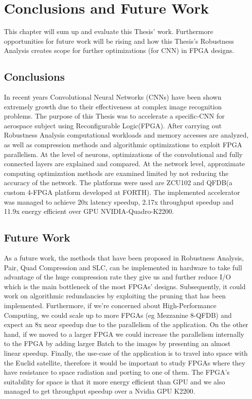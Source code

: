 \chapter{Conclusions and Future Work} %
\label{Chapter7}

This chapter will sum up and evaluate this Thesis’ work. Furthermore opportunities for future work will be rising and how this Thesis's Robustness Analysis creates scope for further optimizations (for CNN) in FPGA designs. 

\section{Conclusions}
In recent years Convolutional Neural Networks (CNNs) have been shown extremely growth due to their effectiveness at complex image recognition problems.
The purpose of this Thesis was to accelerate a specific-CNN for aerospace subject using  Reconfigurable Logic(FPGA).
After carrying out Robustness Analysis computational workloads and memory accesses are analyzed, as well as compression methods and algorithmic optimizations to exploit FPGA parallelism. At the level of neurons, optimizations of the convolutional and fully connected layers are explained and compared. At the network level, approximate computing optimization methods are examined limited by not reducing the accuracy of the network. The platforms were used are ZCU102 and QFDB(a custom 4-FPGA platform developed at FORTH). The implemented accelerator was managed to achieve 20x latency speedup, 2.17x throughput speedup and 11.9x energy efficient over GPU NVIDIA-Quadro-K2200.

\section{Future Work}

As a future work, the methods that have been proposed in Robustness Analysis, Pair, Quad Compression and SLC,  can be implemented in hardware to take full advantage of the huge compression rate they give us and further reduce I/O which is the main bottleneck of the most FPGAs' designs.
Subsequently, it could work on algorithmic redundancies by exploiting the pruning that has been implemented.
Furthermore, if we're concerned about High-Performance Computing, we could scale up to more FPGAs (eg Mezzanine 8-QFDB) and expect an 8x near speedup due to the parallelism of the application. On the other hand, if we moved to a larger FPGA we could increase the parallelism internally to the FPGA by adding larger Batch to the images by presenting an almost linear speedup.
Finally, the use-case of the application is to travel into space with the Euclid satellite, therefore it would be important to study FPGAs where they have resistance to space radiation and porting to one of them. The FPGA's suitability for space is that it more energy efficient than GPU and we also managed to get throughput speedup over a Nvidia GPU  K2200.